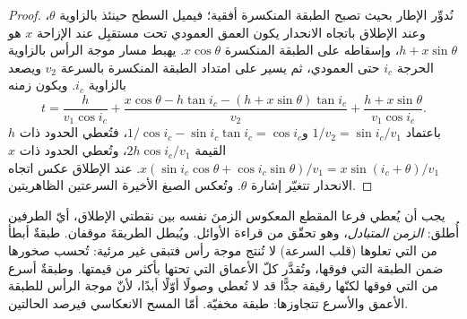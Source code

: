 \begin{proof}
نُدوِّر الإطار بحيث تصبح الطبقة المنكسرة أفقية؛ فيميل السطح حينئذ
بالزاوية $\theta$، وعند الإطلاق باتجاه الانحدار يكون العمق العمودي تحت مستقبِل عند الإزاحة
$x$ هو $h + x\sin\theta$، وإسقاطه على الطبقة المنكسرة
$x\cos\theta$. يهبط مسار موجة الرأس بالزاوية الحرجة $i_c$ حتى
العمودي، ثم يسير على امتداد الطبقة المنكسرة بالسرعة $v_2$ ويصعد بالزاوية $i_c$. ويكون زمنه
\[
  t = \frac{h}{v_1\cos i_c} + \frac{x\cos\theta - h\tan i_c - (h + x\sin\theta)\tan i_c}{v_2}
  + \frac{h + x\sin\theta}{v_1\cos i_c}.
\]
باعتماد $1/v_2 = \sin i_c/v_1$ و$1/\cos i_c - \sin i_c\tan i_c = \cos i_c$،
فتُعطي الحدود ذات $h$ القيمة $2h\cos i_c/v_1$، وتُعطي الحدود ذات $x$
$x(\sin i_c\cos\theta + \cos i_c\sin\theta)/v_1 = x\sin(i_c + \theta)/v_1$.
عند الإطلاق عكس اتجاه الانحدار تتغيّر إشارة $\theta$. وتُعكس الصيغ الأخيرة
السرعتين الظاهريتين.
\end{proof}

يجب أن يُعطي فرعا المقطع المعكوس الزمنَ نفسه بين نقطتي الإطلاق،
أيّ الطرفين أُطلق: \emph{الزمن المتبادل}، وهو تحقّق من
قراءة الأوائل. ويُبطل الطريقةَ موقفان. طبقةٌ أبطأ من التي تعلوها
(قلب السرعة) لا تُنتج موجة رأس فتبقى غير مرئية: تُحسب صخورها
ضمن الطبقة التي فوقها، وتُقدَّر كلّ الأعماق التي تحتها بأكثر من قيمتها.
وطبقةٌ أسرع من التي فوقها لكنّها رقيقة جدًّا قد لا تُعطي وصولًا أوّلًا أبدًا، لأنّ
موجة الرأس للطبقة الأعمق والأسرع تتجاوزها: طبقة مخفيّة. أمّا
المسح الانعكاسي فيرصد الحالتين.

